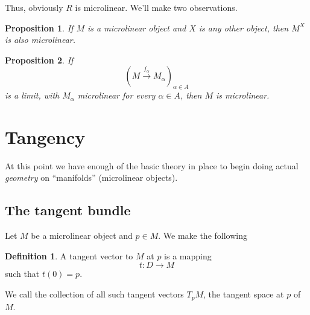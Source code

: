 \documentclass[11pt]{article}
\newtheorem{proposition}{Proposition}[section]
\theoremstyle{definition}
\newtheorem{defn}{Definition}[section]
\numberwithin{equation}{section}
\begin{document}
Thus, obviously \( R \) is microlinear. We'll make two observations.

\begin{proposition}
  If \( M \) is a microlinear object and \( X \) is any other object, then \( M^X \) is also microlinear.
\end{proposition}

\begin{proposition}
  If
  \begin{equation*}
    \left( M\stackrel{f_\alpha}{\longrightarrow} M_\alpha \right)_{\alpha\in A}
  \end{equation*}
  is a limit, with \( M_\alpha \) microlinear for every \( \alpha\in A \), then \( M \) is microlinear.
\end{proposition}

\section{Tangency}

At this point we have enough of the basic theory in place to begin doing actual \emph{geometry} on ``manifolds'' (microlinear objects).

\subsection{The tangent bundle}

Let \( M \) be a microlinear object and \( p\in M \). We make the following

\begin{defn}
  A tangent vector to \( M \) at \( p \) is a mapping 
  \begin{equation*}
    t:D\to M
  \end{equation*}
  such that \( t(0)=p \).
\end{defn}

We call the collection of all such tangent vectors \( T_pM \), the tangent space at \( p \) of \( M \).


\clearpage


\end{document}
